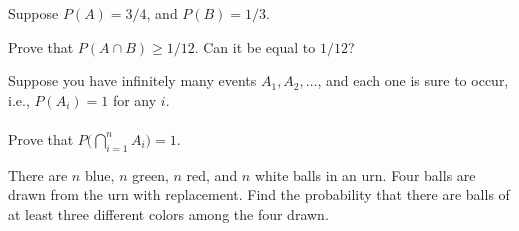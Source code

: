 \begin{problem}[Handout 2, \# 17]
  Suppose \(P(A)=3/4\), and \(P(B)=1/3\).

  Prove that \(P(A\cap B)\geq 1/12\). Can it be equal to \(1/12\)?
\end{problem}
\begin{solution}

\end{solution}
\newpage

\begin{problem}[Handout 2, \# 18]
  Suppose you have infinitely many events \(A_1,A_2,\dotsc\), and each one
  is sure to occur, i.e., \(P(A_i)=1\) for any \(i\).
  \\\\
  Prove that \(P\bigl(\bigcap_{i=1}^n A_i\bigr)=1\).
\end{problem}
\begin{solution}

\end{solution}
\newpage

\begin{problem}[Handout 2, \# 19]
  There are \(n\) blue, \(n\) green, \(n\) red, and \(n\) white balls in an
  urn. Four balls are drawn from the urn with replacement. Find the
  probability that there are balls of at least three different colors among
  the four drawn.
\end{problem}
\begin{solution}

\end{solution}

